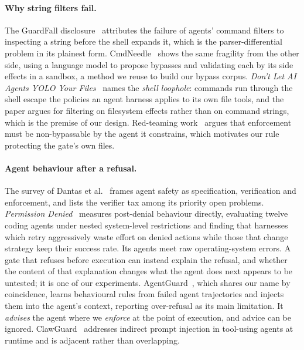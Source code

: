 \paragraph{Why string filters fail.}
The GuardFall disclosure~\cite{guardfall} attributes the failure of agents' command filters to
inspecting a string before the shell expands it, which is the parser-differential problem in
its plainest form. CmdNeedle~\cite{cmdneedle} shows the same fragility from the other side, using
a language model to propose bypasses and validating each by its side effects in a sandbox, a
method we reuse to build our bypass corpus. \emph{Don't Let AI Agents YOLO Your
Files}~\cite{yolo} names the \emph{shell loophole}: commands run through the shell escape the
policies an agent harness applies to its own file tools, and the paper argues for filtering on
filesystem effects rather than on command strings, which is the premise of our design.
Red-teaming work~\cite{redteam-agentic} argues that enforcement must be non-bypassable by the
agent it constrains, which motivates our rule protecting the gate's own files.

\paragraph{Agent behaviour after a refusal.}
The survey of Dantas et al.~\cite{survey-safe-agents} frames agent safety as specification,
verification and enforcement, and lists the verifier tax among its priority open problems.
\emph{Permission Denied}~\cite{permission-denied} measures post-denial behaviour directly,
evaluating twelve coding agents under nested system-level restrictions and finding that
harnesses which retry aggressively waste effort on denied actions while those that change
strategy keep their success rate. Its
agents meet raw operating-system errors. A gate that refuses before execution can instead explain
the refusal, and whether the content of that explanation changes what the agent does next appears
to be untested; it is one of our experiments. AgentGuard~\cite{agentguard-trajectories}, which
shares our name by coincidence, learns behavioural rules from failed agent trajectories and
injects them into the agent's context, reporting over-refusal as its main limitation. It
\emph{advises} the agent where we \emph{enforce} at the point of execution, and advice can be
ignored. ClawGuard~\cite{clawguard} addresses indirect prompt injection in tool-using agents at
runtime and is adjacent rather than overlapping.

